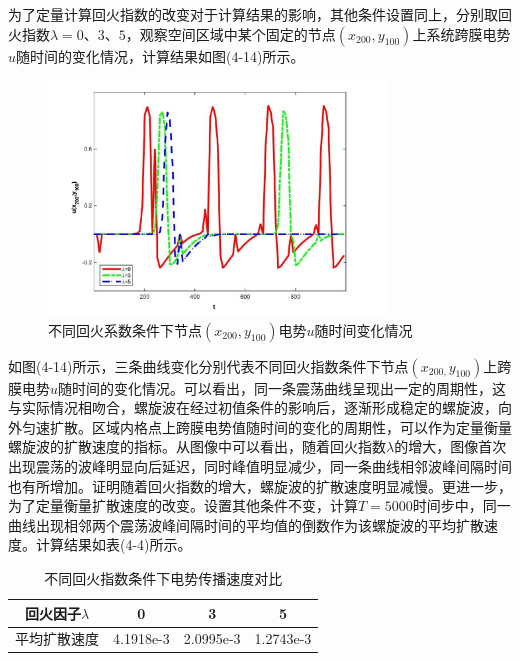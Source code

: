 \documentclass[twoside,UTF8]{nputhesis}
\begin{document}
为了定量计算回火指数的改变对于计算结果的影响，其他条件设置同上，分别取回火指数$\lambda =0$、$3$、$5$，观察空间区域中某个固定的节点$({{x}_{200}},{{y}_{100}})$上系统跨膜电势$u$随时间的变化情况，计算结果如图(4-14)所示。
\begin{figure}[h]
	\centering
	\includegraphics[width=0.8\textwidth,height=0.4\textwidth]{figures/Dotwave.jpg}
	\hspace{0.04\textwidth}
	\setlength{\abovecaptionskip}{-0.1cm} %
	\caption{不同回火系数条件下节点$({{x}_{200}},{{y}_{100}})$电势$u$随时间变化情况}
\end{figure}

如图(4-14)所示，三条曲线变化分别代表不同回火指数条件下节点$({{x}_{200,}}{{y}_{100}})$上跨膜电势$u$随时间的变化情况。可以看出，同一条震荡曲线呈现出一定的周期性，这与实际情况相吻合，螺旋波在经过初值条件的影响后，逐渐形成稳定的螺旋波，向外匀速扩散。区域内格点上跨膜电势值随时间的变化的周期性，可以作为定量衡量螺旋波的扩散速度的指标。从图像中可以看出，随着回火指数$\lambda $的增大，图像首次出现震荡的波峰明显向后延迟，同时峰值明显减少，同一条曲线相邻波峰间隔时间也有所增加。证明随着回火指数的增大，螺旋波的扩散速度明显减慢。更进一步，为了定量衡量扩散速度的改变。设置其他条件不变，计算$T=5000$时间步中，同一曲线出现相邻两个震荡波峰间隔时间的平均值的倒数作为该螺旋波的平均扩散速度。计算结果如表(4-4)所示。
\begin{table}[h]
	\centering

	\setlength{\abovecaptionskip}{0.2cm} %
	\caption[labelTabtab1]{不同回火指数条件下电势传播速度对比}
	\renewcommand\tabcolsep{1em}
	\begin{tabular}{cccc}
		\toprule
		{回火因子$\lambda $} &  {0} & {3} & {5} \\
		\midrule
		平均扩散速度 & 4.1918e-3 &2.0995e-3&1.2743e-3\\
		\bottomrule
	\end{tabular}
\end{table}
\end{document}

